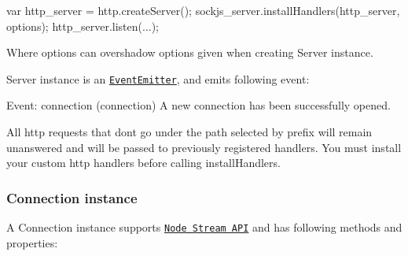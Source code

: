 \begin{DoxyCode}
var http\_server = http.createServer();
sockjs\_server.installHandlers(http\_server, options);
http\_server.listen(...);
\end{DoxyCode}


Where {\ttfamily options} can overshadow options given when creating {\ttfamily Server} instance.

{\ttfamily Server} instance is an \href{http://nodejs.org/docs/v0.4.10/api/events.html#events.EventEmitter}{\tt Event\+Emitter}, and emits following event\+:


\begin{DoxyDescription}
\item[Event\+: connection (connection) ]A new connection has been successfully opened. 
\end{DoxyDescription}

All http requests that don\textquotesingle{}t go under the path selected by {\ttfamily prefix} will remain unanswered and will be passed to previously registered handlers. You must install your custom http handlers before calling {\ttfamily install\+Handlers}.

\subsubsection*{Connection instance}

A {\ttfamily Connection} instance supports \href{http://nodejs.org/docs/v0.5.8/api/streams.html}{\tt Node Stream A\+PI} and has following methods and properties\+:


